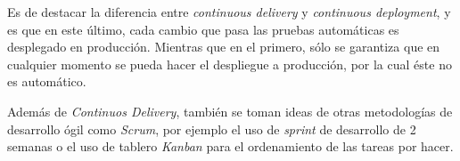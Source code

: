 Es de destacar la diferencia entre \textit{continuous delivery} y \textit{continuous deployment}, y es que en este último, cada cambio que pasa las pruebas automáticas es desplegado en producción. Mientras que en el primero, sólo se garantiza que en cualquier momento se pueda hacer el despliegue a producción, por la cual éste no es automático.

Además de \textit{Continuos Delivery}, también se toman ideas de otras metodologías de desarrollo ógil como \textit{Scrum}, por ejemplo el uso de \textit{sprint} de desarrollo de 2 semanas o el uso de tablero \textit{Kanban} para el ordenamiento de las tareas por hacer.

